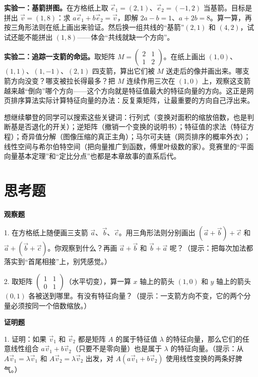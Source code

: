 \begin{shiyan}
\textbf{实验一：基箭拼图。}在方格纸上取 $\vec{e}_1=(2,1)$、$\vec{e}_2=(-1,2)$ 当基箭。目标是拼出 $\vec{v}=(1,8)$：求 $a\vec{e}_1+b\vec{e}_2=\vec{v}$，即解 $2a-b=1$、$a+2b=8$。算一算，再按三角形法则在纸上画出来验证。然后换一组共线的“基箭”$(2,1)$ 和 $(4,2)$，试试还能不能拼出 $(1,8)$——体会“共线就缺一个方向”。

\textbf{实验二：追踪一支箭的命运。}取矩阵 $M=\begin{pmatrix}2&1\\1&2\end{pmatrix}$。在纸上画出 $(1,0)$、$(1,1)$、$(1,-1)$、$(2,1)$ 四支箭，算出它们被 $M$ 送走后的像并画出来。哪支箭方向没变？哪支被拉长得最多？把 $M$ 连续作用三次在 $(1,0)$ 上，观察这支箭越来越“倒向”哪个方向——这个方向就是特征值最大的特征向量的方向。这正是网页排序算法实际计算特征向量的办法：反复乘矩阵，让最重要的方向自己浮出来。
\end{shiyan}

\begin{pandeng}
想继续攀登的同学可以搜索这些关键词：行列式（变换对面积的缩放倍数，也是判断基是否退化的开关）；逆矩阵（撤销一个变换的说明书）；特征值的求法（特征方程）；奇异值分解（图像压缩的真正主角）；马尔可夫链（网页排序的概率外衣）；线性空间与希尔伯特空间（把向量推广到函数，傅里叶级数的家）。竞赛里的“平面向量基本定理”和“定比分点”也都是本章故事的直系后代。
\end{pandeng}

\section*{思考题}

\textbf{观察题}

1. 在方格纸上随便画三支箭 $\vec{a}$、$\vec{b}$、$\vec{c}$。用三角形法则分别画出 $(\vec{a}+\vec{b})+\vec{c}$ 和 $\vec{a}+(\vec{b}+\vec{c})$。你观察到什么？再画 $\vec{a}+\vec{b}$ 和 $\vec{b}+\vec{a}$ 呢？（提示：把每次加法都落实到“首尾相接”上，别凭感觉。）

2. 取矩阵 $\begin{pmatrix}1&1\\0&1\end{pmatrix}$（水平切变），算一算 $x$ 轴上的箭头 $(1,0)$ 和 $y$ 轴上的箭头 $(0,1)$ 各被送到哪里。有没有特征向量？（提示：一支箭方向不变，它的两个分量必须按同一个倍数缩放。）

\textbf{证明题}

1. 证明：如果 $\vec{v}_1$ 和 $\vec{v}_2$ 都是矩阵 $A$ 的属于特征值 $\lambda$ 的特征向量，那么它们的任意线性组合 $a\vec{v}_1+b\vec{v}_2$（只要不是零向量）也是属于 $\lambda$ 的特征向量。（提示：从 $A\vec{v}_1=\lambda\vec{v}_1$ 和 $A\vec{v}_2=\lambda\vec{v}_2$ 出发，对 $A(a\vec{v}_1+b\vec{v}_2)$ 使用线性变换的两条好脾气。）

